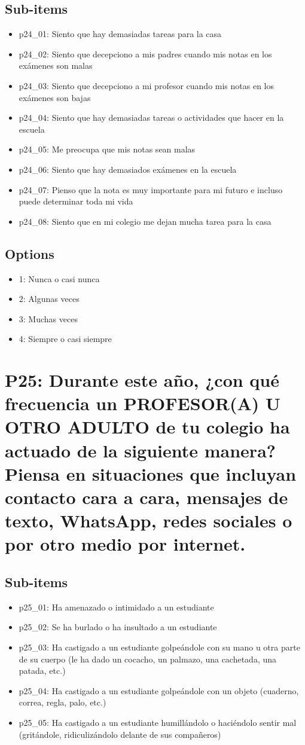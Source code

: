 \documentclass[11pt]{article}
\begin{document}
\subsection*{Sub-items}
\begin{itemize}[leftmargin=*]
  \item p24\_01: Siento que hay demasiadas tareas para la casa
  \item p24\_02: Siento que decepciono a mis padres cuando mis notas en los exámenes son malas
  \item p24\_03: Siento que decepciono a mi profesor cuando mis notas en los exámenes son bajas
  \item p24\_04: Siento que hay demasiadas tareas o actividades que hacer en la escuela
  \item p24\_05: Me preocupa que mis notas sean malas
  \item p24\_06: Siento que hay demasiados exámenes en la escuela
  \item p24\_07: Pienso que la nota es muy importante para mi futuro e incluso puede determinar toda mi vida
  \item p24\_08: Siento que en mi colegio me dejan mucha tarea para la casa
\end{itemize}
\subsection*{Options}
\begin{itemize}[leftmargin=*]
  \item 1: Nunca o casi nunca
  \item 2: Algunas veces
  \item 3: Muchas veces
  \item 4: Siempre o casi siempre
\end{itemize}
\bigskip
\section*{P25: Durante este año, ¿con qué frecuencia un PROFESOR(A) U OTRO ADULTO de tu colegio ha actuado de la siguiente manera? Piensa en situaciones que incluyan contacto cara a cara, mensajes de texto, WhatsApp, redes sociales o por otro medio por internet.}
\subsection*{Sub-items}
\begin{itemize}[leftmargin=*]
  \item p25\_01: Ha amenazado o intimidado a un estudiante
  \item p25\_02: Se ha burlado o ha insultado a un estudiante
  \item p25\_03: Ha castigado a un estudiante golpeándole con su mano u otra parte de su cuerpo (le ha dado un cocacho, un palmazo, una cachetada, una patada, etc.)
  \item p25\_04: Ha castigado a un estudiante golpeándole con un objeto (cuaderno, correa, regla, palo, etc.)
  \item p25\_05: Ha castigado a un estudiante humillándolo o haciéndolo sentir mal (gritándole, ridiculizándolo delante de sus compañeros)
\end{itemize}
\end{document}

